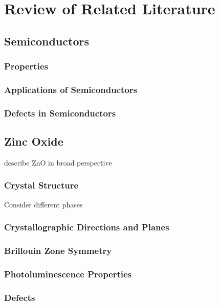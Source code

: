\chapter{Review of Related Literature}
\section{Semiconductors}
    \subsection{Properties}
    \subsection{Applications of Semiconductors}
    \subsection{Defects in Semiconductors}
\section{Zinc Oxide}
    describe ZnO in broad perspective
    \subsection{Crystal Structure}
    Consider different phases
    \subsection{Crystallographic Directions and Planes}
    \subsection{Brillouin Zone Symmetry}
    \subsection{Photoluminescence Properties}
    \subsection{Defects}

